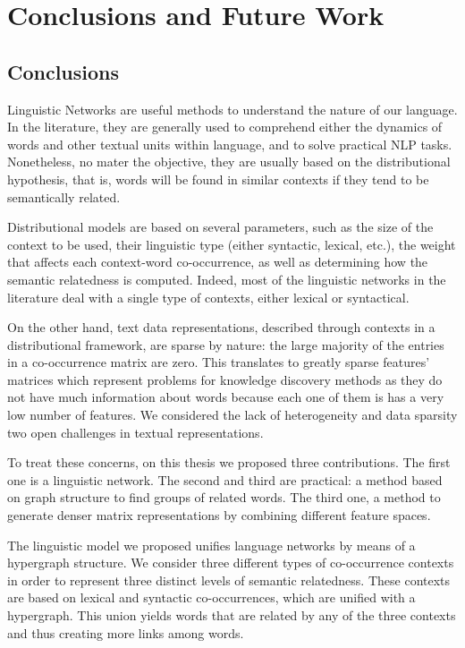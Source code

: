 \chapter{Conclusions and Future Work}
\label{chap:conclusions}
\section{Conclusions}
Linguistic Networks are useful methods to understand the nature of our language. In the literature, they are generally used to comprehend either the dynamics of words and other textual units within language, and to solve practical NLP tasks. Nonetheless, no mater the objective, they are usually based on the distributional hypothesis, that is, words will be found in similar contexts if they tend to be semantically related.

Distributional models are based on several parameters, such as the size of the context to be used, their linguistic type (either syntactic, lexical, etc.), the weight that affects each context-word co-occurrence, as well as determining how the semantic relatedness is computed. Indeed, most of the linguistic networks in the literature deal with a single type of contexts, either lexical or syntactical.

On the other hand, text data representations, described through contexts in a distributional framework, are sparse by nature: the large majority of the entries in a co-occurrence matrix are zero. This translates to greatly sparse features' matrices which represent problems for knowledge discovery methods as they do not have much information about words because each one of them is has a very low number of features. We considered the lack of heterogeneity and data sparsity two open challenges in textual representations.

To treat these concerns, on this thesis we proposed three contributions. The first one is a linguistic network. The second and third are practical: a method based on graph structure to find groups of related words. The third one, a method to generate denser matrix representations by combining different feature spaces.

The linguistic model we proposed unifies language networks by means of a hypergraph structure. We consider three different types of co-occurrence contexts in order to represent three distinct levels of semantic relatedness. These contexts are based on lexical and syntactic co-occurrences, which are unified with a hypergraph. This union yields words that are related by any of the three contexts and thus creating more links among words. 

